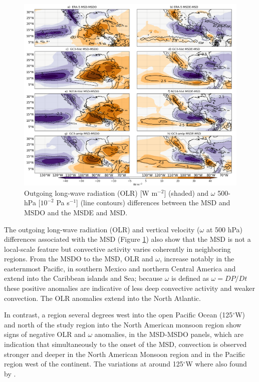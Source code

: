 
 \begin{figure}[t!]
\includegraphics[width=\linewidth]{figures/fig4_olrv_3.png}
\caption{Outgoing long-wave radiation (OLR) [W m$^{-2}$] (shaded) and $\omega$ 500-hPa [$10^{-2}$ Pa s$^{-1}$] (line contours) differences between the MSD and MSDO and the MSDE and MSD.}
\label{fig:olranom}
\end{figure}

 The outgoing long-wave radiation (OLR) and vertical velocity ($\omega$ at 500 hPa) differences associated with the MSD (Figure \ref{fig:olranom}) also show that the MSD is not a local-scale feature but convective activity varies coherently in neighboring regions. From the MSDO to the MSD, OLR and $\omega$, increase notably in the easternmost Pacific, in southern Mexico and northern Central America and extend into the Caribbean islands and Sea; because $\omega$ is defined as $\omega=DP/Dt$  these positive anomalies are indicative of less deep convective activity and weaker convection. The OLR anomalies extend into the North Atlantic. 
 
 In contrast, a region several degrees west into the open Pacific Ocean (125$^\circ$W) and north of the study region into the North American monsoon region show signs of negative OLR and $\omega$ anomalies, in the MSD-MSDO panels, which are indication that simultaneously to the onset of the MSD,  convection is observed stronger and deeper in the North American Monsoon region and in the Pacific region west of the continent. The variations at around 125$^\circ$W where also found by \cite{herrera2015}. 
 
